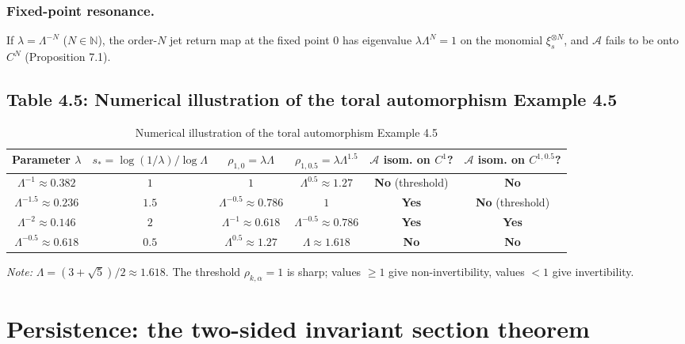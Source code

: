 \documentclass[11pt,a4paper]{article}
\theoremstyle{plain}
\theoremstyle{definition}
\theoremstyle{remark}
\numberwithin{equation}{section}
\numberwithin{figure}{section}
\begin{document}
\subsubsection{Fixed-point resonance.} If $\lambda=\Lambda^{-N}$ ($N\in\mathbb N$), the order-$N$ jet return map at the fixed point $0$ has eigenvalue $\lambda\Lambda^N=1$ on the monomial $\xi_s^{\otimes N}$, and $\mathcal A$ fails to be onto $C^N$ (Proposition 7.1).

\subsection{Table 4.5: Numerical illustration of the toral automorphism Example 4.5}

\begin{table}[h]
\centering
\begin{tabular}{c|c|c|c|c|c}
\toprule
Parameter $\lambda$ & $s_*=\log(1/\lambda)/\log\Lambda$ & $\rho_{1,0}=\lambda\Lambda$ & $\rho_{1,0.5}=\lambda\Lambda^{1.5}$ & $\mathcal A$ isom. on $C^1$? & $\mathcal A$ isom. on $C^{1,0.5}$? \\
\midrule
$\Lambda^{-1}\approx 0.382$ & $1$ & $1$ & $\Lambda^{0.5}\approx 1.27$ & \textbf{No} (threshold) & \textbf{No} \\
$\Lambda^{-1.5}\approx 0.236$ & $1.5$ & $\Lambda^{-0.5}\approx 0.786$ & $1$ & \textbf{Yes} & \textbf{No} (threshold) \\
$\Lambda^{-2}\approx 0.146$ & $2$ & $\Lambda^{-1}\approx 0.618$ & $\Lambda^{-0.5}\approx 0.786$ & \textbf{Yes} & \textbf{Yes} \\
$\Lambda^{-0.5}\approx 0.618$ & $0.5$ & $\Lambda^{0.5}\approx 1.27$ & $\Lambda\approx 1.618$ & \textbf{No} & \textbf{No} \\
\bottomrule
\end{tabular}
\caption{Numerical illustration of the toral automorphism Example 4.5}
\label{tab:table45}
\end{table}

\textit{Note:} $\Lambda=(3+\sqrt5)/2\approx 1.618$. The threshold $\rho_{k,\alpha}=1$ is sharp; values $\ge1$ give non-invertibility, values $<1$ give invertibility.

\section{Persistence: the two-sided invariant section theorem}
\end{document}
